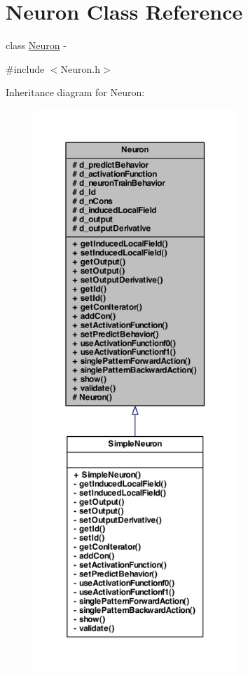 \hypertarget{class_neuron}{
\section{Neuron Class Reference}
\label{class_neuron}
}


class \hyperlink{class_neuron}{Neuron} -\/  




{\ttfamily \#include $<$Neuron.h$>$}



Inheritance diagram for Neuron:
\nopagebreak
\begin{figure}[H]
\begin{center}
\leavevmode
\includegraphics[height=600pt]{class_neuron__inherit__graph}
\end{center}
\end{figure}
